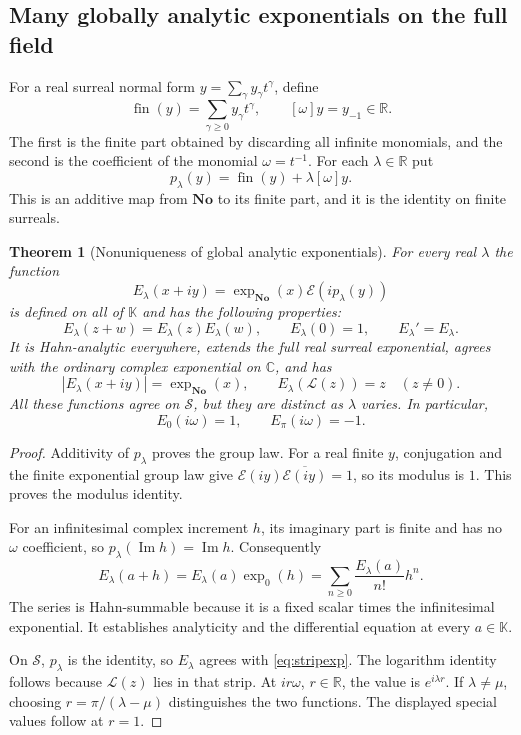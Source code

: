 \documentclass[11pt,a4paper]{article}
\numberwithin{equation}{section}
\newtheorem{theorem}{Theorem}[section]
\theoremstyle{definition}
\theoremstyle{remark}
\newcommand{\No}{\mathbf{No}}
\newcommand{\K}{\mathbb K}
\newcommand{\R}{\mathbb R}
\newcommand{\C}{\mathbb C}
\newcommand{\fin}{\operatorname{fin}}
\newcommand{\E}{\mathcal E}
\newcommand{\Logg}{\mathcal L}
\DeclareMathOperator{\Imm}{Im}
\begin{document}
\subsection{Many globally analytic exponentials on the full field}
For a real surreal normal form $y=\sum_\gamma y_\gamma t^\gamma$, define
\[
 \fin(y)=\sum_{\gamma\geq0}y_\gamma t^\gamma,
 \qquad [\omega]y=y_{-1}\in\R.
\]
The first is the finite part obtained by discarding all infinite monomials, and the second is the coefficient of the monomial $\omega=t^{-1}$. For each $\lambda\in\R$ put
\[
 p_\lambda(y)=\fin(y)+\lambda[\omega]y.
\]
This is an additive map from $\No$ to its finite part, and it is the identity on finite surreals.

\begin{theorem}[Nonuniqueness of global analytic exponentials]
\label{thm:globalexp}
For every real $\lambda$ the function
\begin{equation}
\label{eq:globalexp}
 E_\lambda(x+iy)=\exp_{\No}(x)\E(i p_\lambda(y))
\end{equation}
is defined on all of $\K$ and has the following properties:
\[
 E_\lambda(z+w)=E_\lambda(z)E_\lambda(w),\qquad
 E_\lambda(0)=1,\qquad E_\lambda'=E_\lambda.
\]
It is Hahn-analytic everywhere, extends the full real surreal exponential, agrees with the ordinary complex exponential on $\C$, and has
\[
 |E_\lambda(x+iy)|=\exp_{\No}(x),\qquad
 E_\lambda(\Logg(z))=z\quad(z\ne0).
\]
All these functions agree on $\mathcal S$, but they are distinct as $\lambda$ varies. In particular,
\[
 E_0(i\omega)=1,\qquad E_\pi(i\omega)=-1.
\]
\end{theorem}
\begin{proof}
Additivity of $p_\lambda$ proves the group law. For a real finite $y$, conjugation and the finite exponential group law give
$\E(iy)\overline{\E(iy)}=1$, so its modulus is $1$. This proves the modulus identity.

For an infinitesimal complex increment $h$, its imaginary part is finite and has no $\omega$ coefficient, so $p_\lambda(\Imm h)=\Imm h$. Consequently
\[
 E_\lambda(a+h)=E_\lambda(a)\exp_0(h)
 =\sum_{n\geq0}\frac{E_\lambda(a)}{n!}h^n.
\]
The series is Hahn-summable because it is a fixed scalar times the infinitesimal exponential. It establishes analyticity and the differential equation at every $a\in\K$.

On $\mathcal S$, $p_\lambda$ is the identity, so $E_\lambda$ agrees with \eqref{eq:stripexp}. The logarithm identity follows because $\Logg(z)$ lies in that strip. At $i r\omega$, $r\in\R$, the value is $e^{i\lambda r}$. If $\lambda\ne\mu$, choosing $r=\pi/(\lambda-\mu)$ distinguishes the two functions. The displayed special values follow at $r=1$.
\end{proof}
\end{document}
